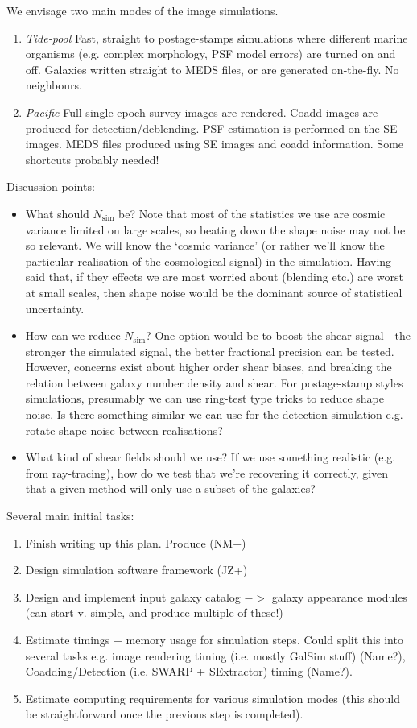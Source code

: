 \documentclass[\docopts]{\docclass}
\begin{document}
We envisage two main modes of the image simulations. 
\begin{enumerate}
\item \emph{Tide-pool} Fast, straight to postage-stamps simulations where different marine organisms (e.g. complex morphology, PSF model errors) are turned on and off. Galaxies written straight to MEDS files, or are generated on-the-fly. No neighbours.
\item \emph{Pacific} Full single-epoch survey images are rendered. Coadd images are produced for detection/deblending. PSF estimation is performed on the SE images. MEDS files produced using SE images and coadd information. Some shortcuts probably needed!
\end{enumerate}

Discussion points:
\begin{itemize}
\item{What should $N_{\mathrm{sim}}$ be? Note that most of the statistics we use are cosmic variance limited on large scales, so beating down the shape noise may not be so relevant. We will know the `cosmic variance' (or rather we'll know the particular realisation of the cosmological signal) in the simulation. Having said that, if they effects we are most worried about (blending etc.) are worst at small scales, then shape noise would be the dominant source of statistical uncertainty.}
\item{How can we reduce $N_{\mathrm{sim}}$? One option would be to boost the shear signal - the stronger the simulated signal, the better fractional precision can be tested. However, concerns exist about higher order shear biases, and breaking the relation between galaxy number density and shear. For postage-stamp styles simulations, presumably we can use ring-test type tricks to reduce shape noise. Is there something similar we can use for the detection simulation e.g. rotate shape noise between realisations?}
\item{What kind of shear fields should we use? If we use something realistic (e.g. from ray-tracing), how do we test that we're recovering it correctly, given that a given method will only use a subset of the galaxies?}
\end{itemize}

Several main initial tasks:
\begin{enumerate}
\item{Finish writing up this plan. Produce  (NM+)}
\item{Design simulation software framework (JZ+)}
\item{Design and implement input galaxy catalog 
$->$ galaxy appearance modules (can start v. simple, and produce multiple of these!)}
\item{Estimate timings + memory usage for simulation steps. Could split this into several tasks e.g. image rendering timing (i.e. mostly GalSim stuff) (Name?), Coadding/Detection (i.e. SWARP + SExtractor) timing (Name?).}
\item{Estimate computing requirements for various simulation modes (this should be straightforward once the previous step is completed).}
\end{enumerate}
\end{document}
